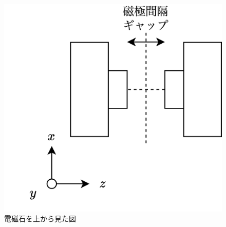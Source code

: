 \begin{figure}
    \centering
    \includegraphics[width=0.5\linewidth]{src/figures/electromagnet/electromagnet.png}
    \caption{電磁石を上から見た図}\label{fig:electromagnet}
\end{figure}
